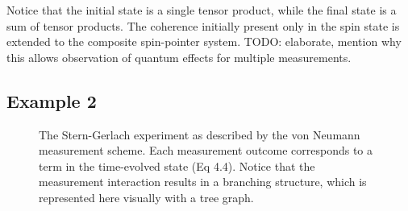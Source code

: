 Notice that the initial state is a single tensor product, while the final state is a sum of tensor products. The coherence initially present only in the spin state is extended to the composite spin-pointer system. TODO: elaborate, mention why this allows observation of quantum effects for multiple measurements.

\subsection{Example 2}

\begin{figure}
\centering\CaptionFontSize


\caption[Insert an abbreviated caption here to show in the List of Figures]
{The Stern-Gerlach experiment as described by the von Neumann measurement scheme. Each measurement outcome corresponds to a term in the time-evolved state (Eq 4.4). Notice that the measurement interaction results in a branching structure, which is represented here visually with a tree graph. }
\label{Figure:Measurement:labelthis2}
\end{figure}

